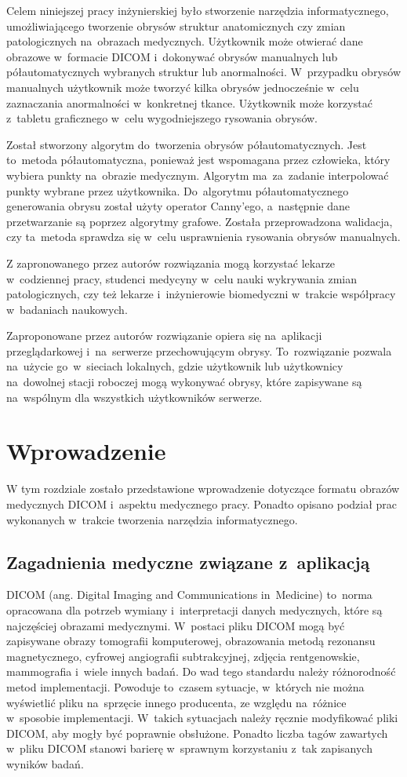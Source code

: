 \documentclass[a4paper,11pt,twoside,openright]{report}
\theoremstyle{definition}
\begin{document}
Celem niniejszej pracy inżynierskiej było stworzenie narzędzia informatycznego,
umożliwiającego tworzenie obrysów struktur anatomicznych czy zmian patologicznych
na~obrazach medycznych. Użytkownik może otwierać
dane obrazowe w~formacie DICOM i~dokonywać obrysów manualnych lub półautomatycznych
wybranych struktur lub anormalności. W~przypadku obrysów manualnych użytkownik
może tworzyć kilka obrysów jednocześnie w~celu zaznaczania anormalności w~konkretnej tkance.
Użytkownik może korzystać z~tabletu graficznego w~celu wygodniejszego rysowania obrysów.

Został stworzony algorytm do~tworzenia obrysów półautomatycznych.
Jest to~metoda półautomatyczna, ponieważ jest wspomagana przez człowieka, który
wybiera punkty na~obrazie medycznym. Algorytm ma~za~zadanie interpolować punkty
wybrane przez użytkownika. Do~algorytmu półautomatycznego generowania obrysu
został użyty operator Canny'ego, a~następnie dane przetwarzanie są
poprzez algorytmy grafowe. Została przeprowadzona walidacja,
czy ta~metoda sprawdza się w~celu usprawnienia rysowania obrysów manualnych.

Z zapronowanego przez autorów rozwiązania mogą korzystać lekarze w~codziennej pracy,
studenci medycyny w~celu nauki wykrywania zmian patologicznych, czy też lekarze i~inżynierowie
biomedyczni w~trakcie współpracy w~badaniach naukowych.

Zaproponowane przez autorów rozwiązanie opiera się na~aplikacji przeglądarkowej
i~na~serwerze przechowującym obrysy. To~rozwiązanie pozwala na~użycie go~w~sieciach
lokalnych, gdzie użytkownik lub użytkownicy na~dowolnej stacji roboczej mogą
wykonywać obrysy, które zapisywane są na~wspólnym dla wszystkich użytkowników serwerze.


\chapter {Wprowadzenie}

W tym rozdziale zostało przedstawione wprowadzenie dotyczące formatu obrazów
medycznych DICOM i~aspektu medycznego pracy.
Ponadto opisano podział prac wykonanych w~trakcie tworzenia
narzędzia informatycznego.

\section {Zagadnienia medyczne związane z~aplikacją}

DICOM (ang. Digital Imaging and Communications in~Medicine) \cite{DICOM} to~norma
opracowana dla potrzeb wymiany i~interpretacji danych medycznych, które są
najczęściej obrazami medycznymi. W~postaci pliku DICOM mogą być zapisywane obrazy
tomografii komputerowej, obrazowania metodą rezonansu magnetycznego, cyfrowej
angiografii subtrakcyjnej, zdjęcia rentgenowskie, mammografia i~wiele innych badań.
Do wad tego standardu należy różnorodność metod implementacji. Powoduje to~czasem
sytuacje, w~których nie można wyświetlić pliku na~sprzęcie innego producenta, ze
względu na~różnice w~sposobie implementacji. W~takich sytuacjach należy ręcznie
modyfikować pliki DICOM, aby mogły być poprawnie obsłużone. Ponadto liczba tagów zawartych w~pliku
DICOM stanowi barierę w~sprawnym korzystaniu z~tak zapisanych wyników badań.
\end{document}
